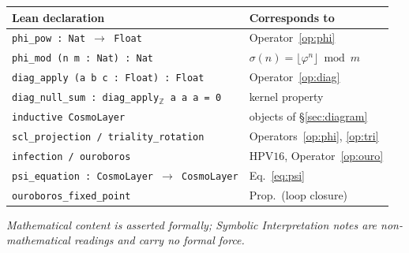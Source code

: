 \documentclass[11pt]{article}
\theoremstyle{definition}
\theoremstyle{plain}
\theoremstyle{remark}
\newcommand{\phigr}{\varphi}
\newcommand{\HPV}{\mathrm{HPV16}}
\begin{document}
\begin{center}
\renewcommand{\arraystretch}{1.3}
\begin{tabular}{@{}l l@{}}
\toprule
\textbf{Lean declaration} & \textbf{Corresponds to} \\
\midrule
\texttt{phi\_pow : Nat }$\to$\texttt{ Float}          & Operator~\ref{op:phi} \\
\texttt{phi\_mod (n m : Nat) : Nat}                    & $\sigma(n)=\lfloor\phigr^n\rfloor\bmod m$ \\
\texttt{diag\_apply (a b c : Float) : Float}           & Operator~\ref{op:diag} \\
\texttt{diag\_null\_sum : diag\_apply}$_{\mathbb Z}$\texttt{ a a a = 0} & kernel property \\
\texttt{inductive CosmoLayer}                          & objects of \S\ref{sec:diagram} \\
\texttt{scl\_projection / triality\_rotation}          & Operators~\ref{op:phi}, \ref{op:tri} \\
\texttt{infection / ouroboros}                         & $\HPV$, Operator~\ref{op:ouro} \\
\texttt{psi\_equation : CosmoLayer }$\to$\texttt{ CosmoLayer} & Eq.~\eqref{eq:psi} \\
\texttt{ouroboros\_fixed\_point}                       & Prop.\ (loop closure) \\
\bottomrule
\end{tabular}
\end{center}

\vfill
\begin{center}\small
\textit{Mathematical content is asserted formally; \emph{Symbolic
Interpretation} notes are non-mathematical readings and carry no formal force.}
\end{center}
\end{document}
